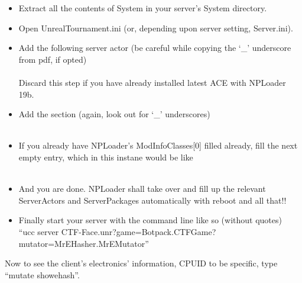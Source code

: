 \documentclass{article}
\theoremstyle{definition}
\newcommand{\FileColor}[1]{{\color{Purple} #1}}
\newcommand{\FolderColor}[1]{{\color{mygray} #1}}
\begin{document}
\begin{itemize}
\item Extract all the contents of \FolderColor{System} in your server's \FolderColor{System} directory.
\item Open \FileColor{UnrealTournament.ini} (or, depending upon server setting, \FileColor{Server.ini}).
\item Add the following server actor (be careful while copying the `\_' underscore from pdf, if opted)\\
\\
Discard this step if you have already installed latest ACE with NPLoader 19b.
\item Add the section (again, look out for `\_' underscores) \\

\\
\item If you already have NPLoader's ModInfoClasses[0] filled already, fill the next empty entry, which in this instane would be like\\

\\

\item And you are done. NPLoader shall take over and fill up the relevant ServerActors and ServerPackages automatically with reboot and all that!!
\item Finally start your server with the command line like so (without quotes)\\
``ucc server CTF-Face.unr?game=Botpack.CTFGame?mutator=MrEHasher.MrEMutator''

\end{itemize}

Now to see the client's electronics' information, CPUID to be specific, type ``mutate showehash''.
\end{document}
